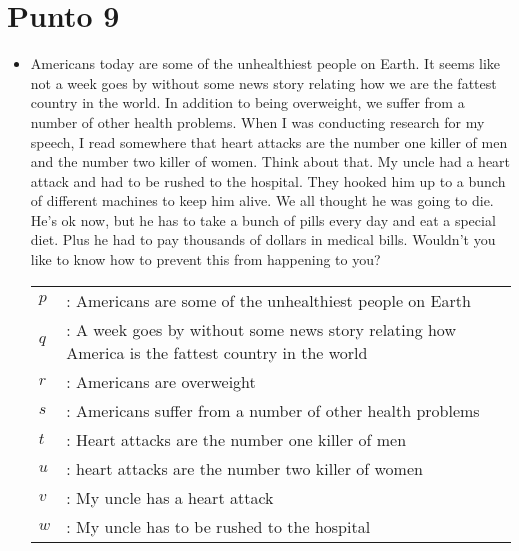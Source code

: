 \documentclass{article}
\begin{document}
\section{Punto 9}
\begin{itemize}
	\item Americans today are some of the unhealthiest people on Earth. It seems like not a week goes by without some news story relating how we are the fattest country in the world. In addition to being overweight, we suffer from a number of other health problems. When I was conducting research for my speech, I read somewhere that heart attacks are the number one killer of men and the number two killer of women. Think about that. My uncle had a heart attack and had to be rushed to the hospital. They hooked him up to a bunch of different machines to keep him alive. We all thought he was going to die. He's ok now, but he has to take a bunch of pills every day and eat a special diet. Plus he had to pay thousands of dollars in medical bills. Wouldn't you like to know how to prevent this from happening to you?
	      \begin{center}
		      \begin{NiceTabular}{l l}
			      $p$ & : Americans are some of the unhealthiest people on Earth                                                                 \\
			      $q$ & : A week goes by without some news story relating how America is the fattest country in the world                        \\
			      $r$ & : Americans are overweight                                                                                               \\
			      $s$ & : Americans suffer from a number of other health problems                                                                \\
			      $t$ & : Heart attacks are the number one killer of men                                                                         \\
			      $u$ & : heart attacks are the number two killer of women                                                                       \\
			      $v$ & : My uncle has a heart attack                                                                                            \\
			      $w$ & : My uncle has to be rushed to the hospital                                                                              \\

\end{NiceTabular}
\end{center}
\end{itemize}
\end{document}
